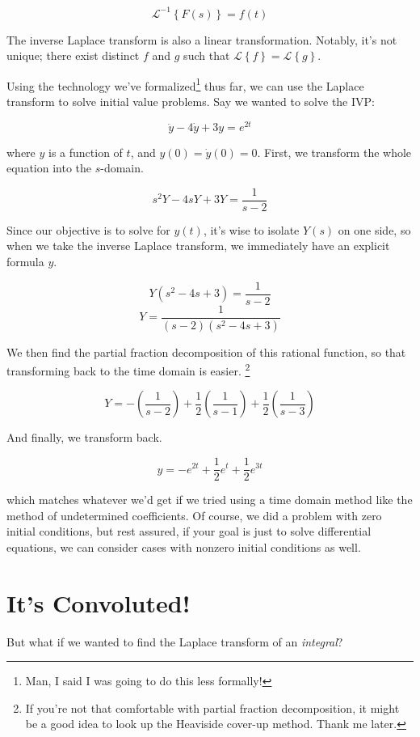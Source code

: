 \documentclass[
  letterpaper,
  DIV=11,
  numbers=noendperiod]{scrreprt}
\begin{document}
\[\mathcal{L}^{-1} \left\{F(s)\right\} = f(t)\]

The inverse Laplace transform is also a linear transformation. Notably,
it's not unique; there exist distinct \(f\) and \(g\) such that
\(\mathcal{L} \left\{f \right\} = \mathcal{L} \left\{g \right\}\).

Using the technology we've formalized\footnote{Man, I said I was going
  to do this less formally!} thus far, we can use the Laplace transform
to solve initial value problems. Say we wanted to solve the IVP:

\[\ddot{y} - 4\dot{y} + 3 y = e^{2t}\]

where \(y\) is a function of \(t\), and \(y(0) = \dot{y}(0) = 0\).
First, we transform the whole equation into the \(s\)-domain.

\[s^2 Y - 4 sY + 3 Y = \frac{1}{s-2}\]

Since our objective is to solve for \(y(t)\), it's wise to isolate
\(Y(s)\) on one side, so when we take the inverse Laplace transform, we
immediately have an explicit formula \(y\).

\[Y (s^2 - 4 s + 3) = \frac{1}{s-2}\]
\[Y = \frac{1}{(s-2)(s^2 - 4 s + 3)}\]

We then find the partial fraction decomposition of this rational
function, so that transforming back to the time domain is easier.
\footnote{If you're not that comfortable with partial fraction
  decomposition, it might be a good idea to look up the Heaviside
  cover-up method. Thank me later.}

\[Y = -\left(\frac{1}{s-2} \right) + \frac{1}{2}\left(\frac{1}{s-1} \right) + \frac{1}{2}\left(\frac{1}{s-3}\right)\]

And finally, we transform back.

\[y = -e^{2t} + \frac{1}{2} e^{t} + \frac{1}{2} e^{3t}\]

which matches whatever we'd get if we tried using a time domain method
like the method of undetermined coefficients. Of course, we did a
problem with zero initial conditions, but rest assured, if your goal is
just to solve differential equations, we can consider cases with nonzero
initial conditions as well.

\hypertarget{its-convoluted}{%
\section{It's Convoluted!}\label{its-convoluted}}

But what if we wanted to find the Laplace transform of an
\emph{integral}?
\end{document}
